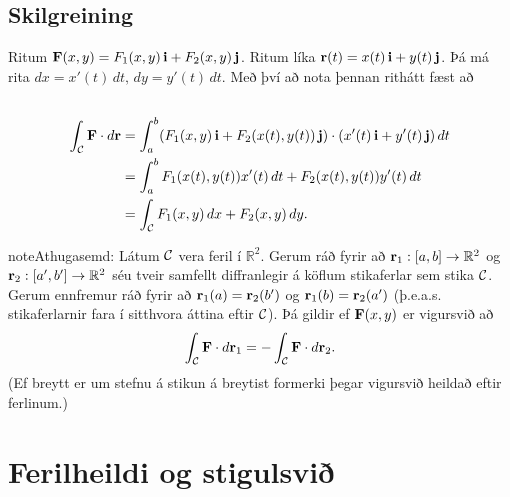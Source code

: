 \documentclass[a4paper,10pt,icelandic]{sphinxmanual}
\begin{document}
\subsection{Skilgreining}
\label{Kafli5:id9}
Ritum
\(\mbox{${\bf F}$}(x,y)=F_1(x,y)\,\mbox{${\bf i}$}+F_2(x,y)\,\mbox{${\bf j}$}\).
Ritum líka
\(\mbox{${\bf r}$}(t)=x(t)\,\mbox{${\bf i}$}+y(t)\,\mbox{${\bf j}$}\).
Þá má rita \(dx=x'(t)\,dt,\, dy=y'(t)\,dt\). Með því að nota þennan
rithátt fæst að
\begin{gather}
\begin{split}\displaystyle\end{split}\notag\\\begin{split}\begin{aligned}
\int_{\cal C}\mbox{${\bf F}$}\cdot d\mbox{${\bf r}$}&=\int_a^b
(F_1(x,y)\,\mbox{${\bf i}$}+F_2(x(t),y(t))\,\mbox{${\bf j}$})\cdot(x'(t)\,\mbox{${\bf i}$}+y'(t)\,\mbox{${\bf j}$})\,dt\\
&=\int_a^b F_1(x(t),y(t))x'(t)\,dt+F_2(x(t),y(t))y'(t)\,dt\\
&=\int_{\cal C} F_1(x,y)\,dx+F_2(x,y)\,dy.\end{aligned}\end{split}\notag
\end{gather}
\begin{notice}{note}{Athugasemd:}
Látum \(\cal C\) vera feril í \({\mathbb  R}^2\). Gerum ráð fyrir að \(\mbox{${\bf r}$}_1:[a,b]\rightarrow {\mathbb  R}^2\) og \(\mbox{${\bf r}$}_2:[a',b']\rightarrow {\mathbb  R}^2\) séu tveir samfellt diffranlegir á köflum stikaferlar sem stika \(\cal C\). Gerum ennfremur ráð fyrir að \(\mbox{${\bf r}$}_1(a)=\mbox{${\bf r}$}_2(b')\) og \(\mbox{${\bf r}$}_1(b)=\mbox{${\bf r}$}_2(a')\) (þ.e.a.s. stikaferlarnir fara í sitthvora áttina eftir \(\cal C\)). Þá gildir ef \(\mbox{${\bf F}$}(x,y)\) er vigursvið að
\begin{gather}
\begin{split}\displaystyle \int_{\cal C} \mbox{${\bf F}$}\cdot d\mbox{${\bf r}$}_1=-\int_{\cal C} \mbox{${\bf F}$}\cdot d\mbox{${\bf r}$}_2.\end{split}\notag
\end{gather}
(Ef breytt er um stefnu á stikun á breytist formerki þegar vigursvið heildað eftir ferlinum.)
\end{notice}


\section{Ferilheildi og stigulsvið}
\label{Kafli5:ferilheildi-og-stigulsvi}
\end{document}
